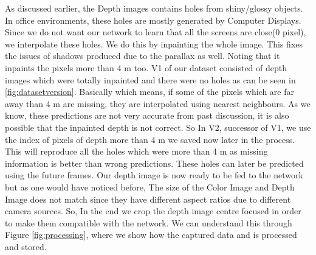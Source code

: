 As discussed earlier, the Depth images contains holes from shiny/glossy objects\cite{shiny}. In office environments, these holes are mostly generated by Computer Displays. Since we do not want our network to learn that all the screens are close(0 pixel), we interpolate these holes. We do this by inpainting \cite{inpainting} the whole image. This fixes the issues of shadows produced due to the parallax as well. Noting that it inpaints the pixels more than 4 m too. V1 of our dataset consisted of depth images which were totally inpainted and there were no holes as can be seen in \ref{fig:datasetversion}. Basically which means, if some of the pixels which are far away than 4 m are missing, they are interpolated using nearest neighbours. As we know, these predictions are not very accurate from past discussion, it is also possible that the inpainted depth is not correct. So In V2, successor of V1, we use the index of pixels of depth more than 4 m we saved now later in the process. This will reproduce all the holes which were more than 4 m as missing information is better than wrong predictions. These holes can later be predicted using the future frames. Our depth image is now ready to be fed to the network but as one would have noticed before, The size of the Color Image and Depth Image does not match since they have different aspect ratios due to different camera sources. So, In the end we crop the depth image centre focused in order to make them compatible with the network. We can understand this through Figure \ref{fig:processing}, where we show how the captured data and is processed and stored. \\






\newpage